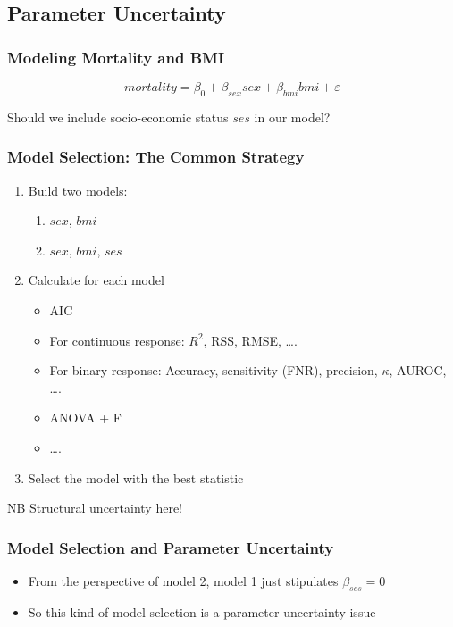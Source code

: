 \documentclass{philslides}
\begin{document}
\subsection{Parameter Uncertainty}
\frame
{
	\frametitle{Modeling Mortality and BMI}
	\[mortality = \beta_0 + \beta_{sex} sex + \beta_{bmi} bmi + \varepsilon\]
	\pause
	
	Should we include socio-economic status $ses$ in our model?  
}
\frame
{
	\frametitle{Model Selection: The Common Strategy}
	\begin{enumerate}
	\item Build two models:
		\begin{enumerate}
		\item $sex$, $bmi$
		\item $sex$, $bmi$, $ses$
		\end{enumerate}
	\item Calculate  for each model
		\begin{itemize}
		\item AIC \autocite[131ff]{Sober2015}
		\item For continuous response:  $R^2$, RSS, RMSE, \ldots.
		\item For binary response:  Accuracy, sensitivity (FNR), precision, $\kappa$, AUROC, \ldots.
		\item ANOVA + F
		\item \ldots.
		\end{itemize}
	\item Select the model with the best statistic
	\end{enumerate}
	\pause
	\blank
	\raggedleft NB Structural uncertainty here!  
}
\frame
{
	\frametitle{Model Selection and Parameter Uncertainty}
	\begin{itemize}
		\item From the perspective of model 2, model 1 just stipulates $\beta_{ses} = 0$
		\item So this kind of model selection is a parameter uncertainty issue
	\end{itemize}
}
\end{document}
